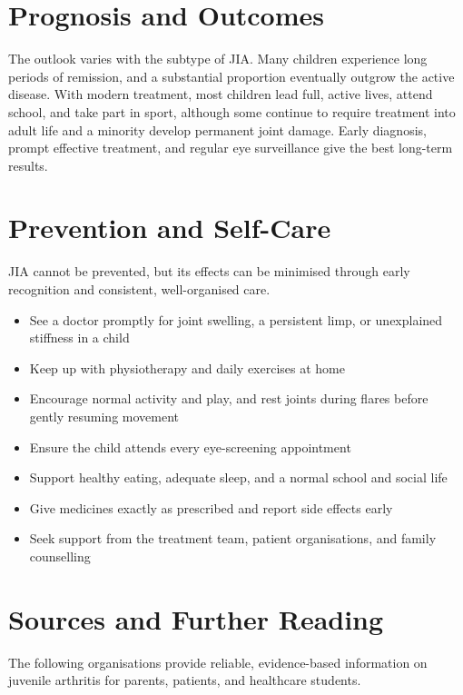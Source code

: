 \section*{Prognosis and Outcomes}
The outlook varies with the subtype of JIA. Many children experience long periods of remission, and a substantial proportion eventually outgrow the active disease. With modern treatment, most children lead full, active lives, attend school, and take part in sport, although some continue to require treatment into adult life and a minority develop permanent joint damage. Early diagnosis, prompt effective treatment, and regular eye surveillance give the best long-term results.

\section*{Prevention and Self-Care}
JIA cannot be prevented, but its effects can be minimised through early recognition and consistent, well-organised care.

\begin{itemize}
    \item See a doctor promptly for joint swelling, a persistent limp, or unexplained stiffness in a child
    \item Keep up with physiotherapy and daily exercises at home
    \item Encourage normal activity and play, and rest joints during flares before gently resuming movement
    \item Ensure the child attends every eye-screening appointment
    \item Support healthy eating, adequate sleep, and a normal school and social life
    \item Give medicines exactly as prescribed and report side effects early
    \item Seek support from the treatment team, patient organisations, and family counselling
\end{itemize}

\section*{Sources and Further Reading}
The following organisations provide reliable, evidence-based information on juvenile arthritis for parents, patients, and healthcare students.

